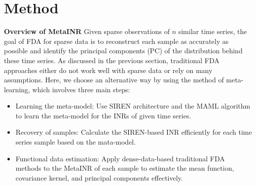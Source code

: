 \documentclass{article}
\begin{document}
\section{Method}
\textbf{Overview of MetaINR}
Given sparse observations of $n$ similar time series, the goal of FDA for sparse data is to reconstruct each sample as accurately as possible and identify the principal components (PC) of the distribution behind these time series.
As discussed in the previous section, traditional FDA approaches either do not work well with sparse data or rely on many assumptions.
Here, we choose an alternative way by using the method of meta-learning, which involves three main steps:

\begin{itemize}
  \item Learning the meta-model: Use SIREN architecture and the MAML algorithm to learn the meta-model for the INRs of given time series.
  \item Recovery of samples: Calculate the SIREN-based INR efficiently for each time series sample based on the mata-model.
  \item Functional data estimation: Apply dense-data-based traditional FDA methods to the MetaINR of each sample to estimate the mean function, covariance kernel, and principal components effectively.
\end{itemize}
\end{document}
